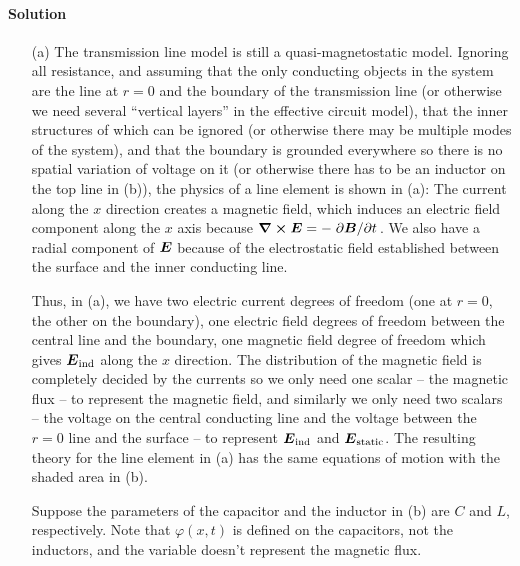 \documentclass[hyperref, a4paper]{article}
\begin{document}
\paragraph{Solution} 
\begin{itemize}
\item[(a)] The transmission line model is still a quasi-magnetostatic model.
Ignoring all resistance, and assuming that 
the only conducting objects in the system 
are the line at $r = 0$ and the boundary of the transmission line
(or otherwise we need several ``vertical layers'' in the effective circuit model),
that the inner structures of which can be ignored
(or otherwise there may be multiple modes of the system),
and that the boundary is grounded everywhere so there is no spatial variation of voltage on it
(or otherwise there has to be an inductor on the top line in (b)),
the physics of a line element is shown in (a):
The current along the $x$ direction creates a magnetic field, 
which induces an electric field component along the $x$ axis 
because $\curl{\vb*{E}} = - \pdv*{\vb*{B}}{t}$.
We also have a radial component of $\vb*{E}$ 
because of the electrostatic field established between the surface and the inner conducting line.

Thus, in (a),
we have two electric current degrees of freedom (one at $r=0$, the other on the boundary),
one electric field degrees of freedom between the central line and the boundary,
one magnetic field degree of freedom 
which gives $\vb*{E}_{\text{ind}}$ along the $x$ direction.
The distribution of the magnetic field is completely decided by the currents 
so we only need one scalar -- the magnetic flux -- to represent the magnetic field,
and similarly we only need two scalars -- the voltage on the central conducting line 
and the voltage between the $r=0$ line and the surface -- 
to represent $\vb*{E}_{\text{ind}}$ and $\vb*{E}_{\text{static}}$.
The resulting theory for the line element in (a) 
has the same equations of motion with the shaded area in (b).

Suppose the parameters of the capacitor and the inductor in (b)
are $C$ and $L$, respectively.
Note that $\varphi(x, t)$ is defined on the capacitors, not the inductors,
and the variable doesn't represent the magnetic flux.


\end{itemize}
\end{document}
